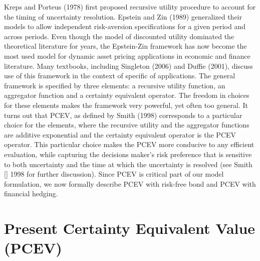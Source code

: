 \documentclass[mnsc,nonblindrev,copyedit]{informs2_wz} %
\newcommand{\OUT}[1]{}
\begin{document}
Kreps and Porteus (1978) first proposed recursive utility procedure to account for the timing of uncertainty resolution. Epstein and Zin (1989) generalized their models to allow independent risk-aversion specifications for a given period and across periods. Even though the model of discounted utility dominated the theoretical literature for years, the Epstein-Zin framework has now become the most used model for dynamic asset pricing applications in economic and finance literature. Many textbooks, including Singleton (2006) and Duffie (2001), discuss use of this framework in the context of specific of applications. The general framework is specified by three elements: a recursive utility function, an aggregator function and a certainty equivalent operator.    The freedom in choices for these elements makes the framework very powerful, yet often too general. It turns out that PCEV, as defined by Smith (1998) corresponds to a particular choice for the elements, where the recursive utility and the aggregator functions are additive exponential and the certainty equivalent operator is the PCEV operator. This particular choice  makes the PCEV more conducive to any efficient evaluation, while capturing the decisions maker's risk preference that is sensitive to both uncertainty and the time at which the uncertainty is resolved (see Smith \ref{} 1998 for further discussion).  Since PCEV is critical part of our model formulation, we now formally describe PCEV with risk-free bond and PCEV with financial hedging.

\OUT{
WHAT ARE WE SAYING HERE?  IS IT A REASON TO USE PCEV, OR SIMPLY SOBEL's METHOD IS BAD?  
CHECK WHETHER THE STATEMENT COMES FROM SMITH AND IF SO, CITE IN THE RIGHT PLACE IN THE RIGHT CONTEXT.While the recursive utility theorem by Epstein and Zin (1989) solves this problem of temporal risk problem, it is not in general consistent with the expected utility preference for consumption. 








}


\section{Present Certainty Equivalent Value (PCEV)}\label{sect:pcev}
\end{document}
